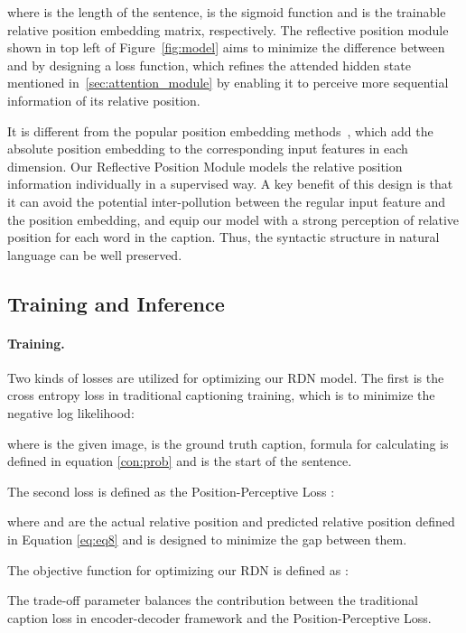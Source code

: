\documentclass[10pt,twocolumn,letterpaper]{article}
\begin{document}
where  is the length of the sentence,  is the sigmoid function and   is the trainable relative position embedding matrix, respectively.
The reflective position module shown in top left of Figure~\ref{fig:model} aims to minimize the difference between  and  by designing a loss function, which refines the attended hidden state  mentioned in~\ref{sec:attention_module} by enabling it to perceive more sequential information of its relative position.

It is different from the popular position embedding methods~\cite{gehring2017convolutional, vaswani2017attention}, which add the absolute position embedding to the corresponding input features in each dimension. Our Reflective Position Module models the relative position information individually in a supervised way.
A key benefit of this design is that it can avoid the potential inter-pollution between the regular input feature and the position embedding, and equip our model with a strong perception of relative position for each word in the caption. Thus, the syntactic structure in natural language can be well preserved.


\subsection{Training and Inference}
\label{sec:training_inference}

\paragraph{Training.} 
Two kinds of losses are utilized for optimizing our RDN model.
The first is the cross entropy loss in traditional captioning training, which is to minimize the negative log likelihood:
\vspace{-0.05in}

where  is the given image,  is the ground truth caption, formula for calculating  is defined in equation \ref{con:prob} and  is the start of the sentence. 

The second loss is defined as the Position-Perceptive Loss :
\vspace{-0.05in}

where  and  are the actual relative position and predicted relative position defined in Equation \ref{eq:eq8} and  is designed to minimize the gap between them. 

The objective function for optimizing our RDN is defined as :

The trade-off parameter  balances the contribution between the traditional caption loss in encoder-decoder framework and the Position-Perceptive Loss.
\vspace{-3mm}
\end{document}
